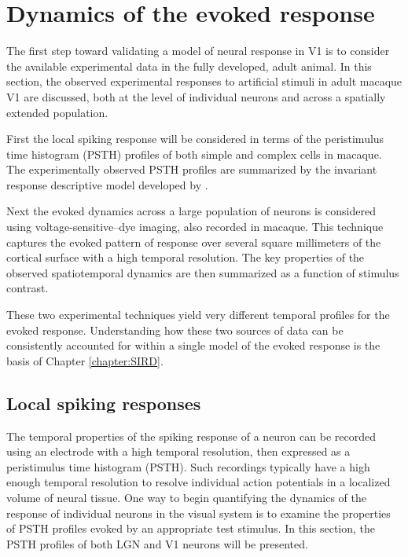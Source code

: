 \documentclass[phd,ianc,twoside]{infthesis}
\begin{document}
\section{Dynamics of the evoked response}
\label{section:evoked_background}

The first step toward validating a model of neural response in V1 is to
consider the available experimental data in the fully developed, adult
animal. In this section, the observed experimental responses to
artificial stimuli in adult macaque V1 are discussed, both at the level
of individual neurons and across a spatially extended population.

First the local spiking response will be considered in terms of the
peristimulus time histogram (PSTH) profiles of both simple and complex
cells in macaque. The experimentally observed PSTH profiles are
summarized by the invariant response descriptive model developed by
\citet{albrecht_jneurophys02}.

Next the evoked dynamics across a large population of neurons is
considered using voltage-sensitive--dye imaging, also recorded in
macaque. This technique captures the evoked pattern of response over
several square millimeters of the cortical surface with a high temporal
resolution. The key properties of the observed spatiotemporal dynamics
are then summarized as a function of stimulus contrast.

These two experimental techniques yield very different temporal profiles
for the evoked response. Understanding how these two sources of data can
be consistently accounted for within a single model of the evoked
response is the basis of Chapter \ref{chapter:SIRD}.

\subsection{Local spiking responses}

The temporal properties of the spiking response of a neuron can be
recorded using an electrode with a high temporal resolution, then
expressed as a peristimulus time histogram (PSTH). Such recordings
typically have a high enough temporal resolution to resolve individual
action potentials in a localized volume of neural tissue. One way to
begin quantifying the dynamics of the response of individual neurons in
the visual system is to examine the properties of PSTH profiles evoked
by an appropriate test stimulus. In this section, the PSTH profiles of
both LGN and V1 neurons will be presented.
\end{document}
